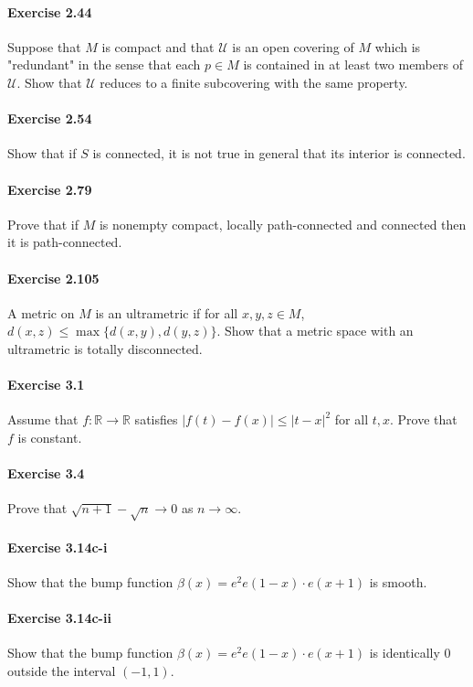 \documentclass{article}
\begin{document}
\paragraph{Exercise 2.44} Suppose that $M$ is compact and that $\mathcal{U}$ is an open covering of $M$ which is "redundant" in the sense that each $p \in M$ is contained in at least two members of $\mathcal{U}$. Show that $\mathcal{U}$ reduces to a finite subcovering with the same property.

\paragraph{Exercise 2.54} Show that if $S$ is connected, it is not true in general that its interior is connected.

\paragraph{Exercise 2.79} Prove that if $M$ is nonempty compact, locally path-connected and connected then it is path-connected.

\paragraph{Exercise 2.105} A metric on $M$ is an ultrametric if for all $x, y, z \in M$, $d(x, z) \leq \max \{d(x, y), d(y, z)\} .$ Show that a metric space with an ultrametric is totally disconnected.

\paragraph{Exercise 3.1} Assume that $f \colon \mathbb{R} \rightarrow \mathbb{R}$ satisfies $|f(t)-f(x)| \leq|t-x|^{2}$ for all $t, x$. Prove that $f$ is constant.

\paragraph{Exercise 3.4} Prove that $\sqrt{n+1}-\sqrt{n} \rightarrow 0$ as $n \rightarrow \infty$.

\paragraph{Exercise 3.14c-i} Show that the bump function $\beta(x)=e^{2} e(1-x) \cdot e(x+1)$ is smooth.

\paragraph{Exercise 3.14c-ii} Show that the bump function $\beta(x)=e^{2} e(1-x) \cdot e(x+1)$ is identically 0 outside the interval $(-1, 1)$.
\end{document}
